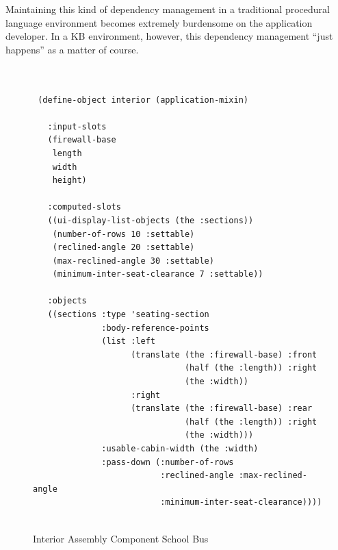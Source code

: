\documentclass [11pt]{book}
\begin{document}
Maintaining this kind of dependency management in a traditional
procedural language environment becomes extremely burdensome on the
application developer. In a KB environment, however, this dependency
management ``just happens'' as a matter of course.
\begin{figure}
\begin{lrbox}{\boxedverb}
\begin{minipage}{\linewidth}

\begin{verbatim}


 (define-object interior (application-mixin)

   :input-slots
   (firewall-base
    length
    width
    height)

   :computed-slots
   ((ui-display-list-objects (the :sections))
    (number-of-rows 10 :settable)
    (reclined-angle 20 :settable)
    (max-reclined-angle 30 :settable)
    (minimum-inter-seat-clearance 7 :settable))

   :objects
   ((sections :type 'seating-section
              :body-reference-points 
              (list :left
                    (translate (the :firewall-base) :front
                               (half (the :length)) :right
                               (the :width))
                    :right
                    (translate (the :firewall-base) :rear
                               (half (the :length)) :right
                               (the :width)))
              :usable-cabin-width (the :width)
              :pass-down (:number-of-rows 
                          :reclined-angle :max-reclined-angle
                          :minimum-inter-seat-clearance))))      
      
\end{verbatim}
\end{minipage}
\end{lrbox}
\fbox{\usebox{\boxedverb}}

\caption{Interior Assembly Component School Bus}

\label{code:school-bus-interior}

\end{figure}
\end{document}
